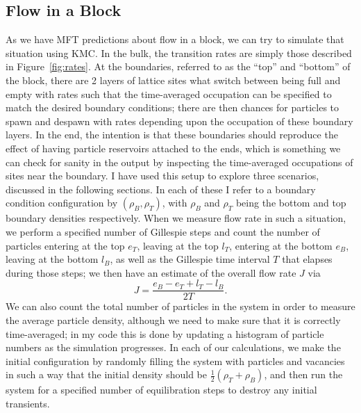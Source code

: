 \subsection{Flow in a Block}
As we have MFT predictions about flow in a block, we can try to simulate that situation using KMC. In the bulk, the transition rates are simply those described in Figure~\ref{fig:rates}. At the boundaries, referred to as the ``top''  and ``bottom''
of the block, there are 2 layers of lattice sites what switch between being full and empty with rates such that the time-averaged occupation can be specified to match the desired boundary conditions; there are then chances for particles to spawn
and despawn with rates depending upon the occupation of these boundary layers. In the end, the intention is that these boundaries should reproduce the effect of having particle reservoirs attached to the ends, which is something we can check for
sanity in the output by inspecting the time-averaged occupations of sites near the boundary. I have used this setup to explore three scenarios, discussed in the following sections. In each of these I refer to a boundary condition configuration
by $(\rho_B, \rho_T)$, with $\rho_B$ and $\rho_T$ being the bottom and top boundary densities respectively.
When we measure flow rate in such a situation, we perform a specified number of Gillespie steps and count the number of particles entering at the top $e_T$, leaving at the top $l_T$, entering at the bottom $e_B$, leaving at the bottom $l_B$,
as well as the Gillespie time interval $T$ that elapses during those steps; we then have an estimate of the overall flow rate $J$ via
\begin{equation}
 J = \frac{e_B-e_T+l_T-l_B}{2T}.
\end{equation}
We can also count the total number of particles in the system in order to measure the average particle density, although we need to make sure that it is correctly time-averaged; in my code this is done by updating a histogram of particle numbers
as the simulation progresses. In each of our calculations, we make the initial configuration by randomly filling the system with particles and vacancies in such a way that the initial density should be $\frac{1}{2}(\rho_T + \rho_B)$, and then
run the system for a specified number of equilibration steps to destroy any initial transients.

